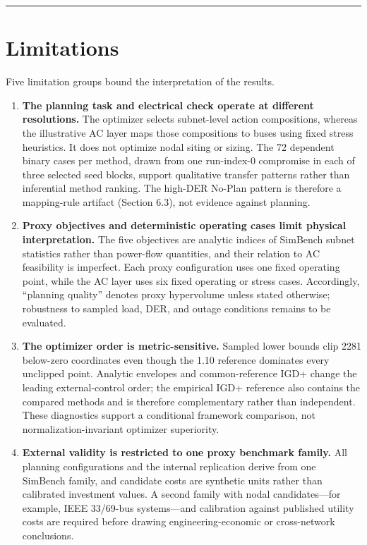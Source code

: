 \documentclass[energies,article,submit,moreauthors]{Definitions/mdpi}
\providecommand{\tightlist}{\setlength{\itemsep}{0pt}\setlength{\parskip}{0pt}}
\begin{document}
\begin{center}\rule{0.5\linewidth}{0.5pt}\end{center}

\section{Limitations}\label{limitations}

Five limitation groups bound the interpretation of the results.

\begin{enumerate}
\def\labelenumi{\arabic{enumi}.}
\tightlist
\item
  \textbf{The planning task and electrical check operate at different resolutions.} The optimizer selects subnet-level action compositions, whereas the illustrative AC layer maps those compositions to buses using fixed stress heuristics. It does not optimize nodal siting or sizing. The 72 dependent binary cases per method, drawn from one run-index-0 compromise in each of three selected seed blocks, support qualitative transfer patterns rather than inferential method ranking. The high-DER No-Plan pattern is therefore a mapping-rule artifact (Section 6.3), not evidence against planning.
\item
  \textbf{Proxy objectives and deterministic operating cases limit physical interpretation.} The five objectives are analytic indices of SimBench subnet statistics rather than power-flow quantities, and their relation to AC feasibility is imperfect. Each proxy configuration uses one fixed operating point, while the AC layer uses six fixed operating or stress cases. Accordingly, ``planning quality'' denotes proxy hypervolume unless stated otherwise; robustness to sampled load, DER, and outage conditions remains to be evaluated.
\item
  \textbf{The optimizer order is metric-sensitive.} Sampled lower bounds clip 2281 below-zero coordinates even though the 1.10 reference dominates every unclipped point. Analytic envelopes and common-reference IGD+ change the leading external-control order; the empirical IGD+ reference also contains the compared methods and is therefore complementary rather than independent. These diagnostics support a conditional framework comparison, not normalization-invariant optimizer superiority.
\item
  \textbf{External validity is restricted to one proxy benchmark family.} All planning configurations and the internal replication derive from one SimBench family, and candidate costs are synthetic units rather than calibrated investment values. A second family with nodal candidates---for example, IEEE 33/69-bus systems---and calibration against published utility costs are required before drawing engineering-economic or cross-network conclusions.

\end{enumerate}
\end{document}

